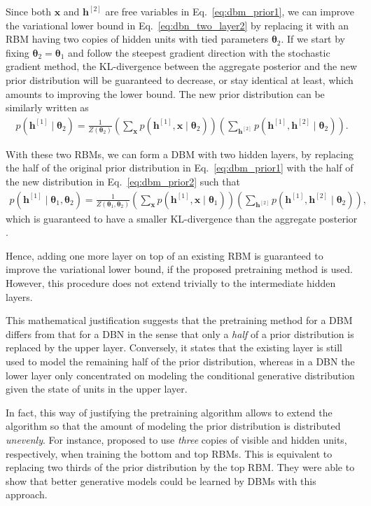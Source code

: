 \documentclass[dissertation,nocontribution,draft*]{aaltoseries}
\newcommand{\qlay}[1]{\left[#1\right]}
\newcommand{\vect}[1]{\mathbf{#1}}
\newcommand{\vects}[1]{\boldsymbol{#1}}
\newcommand{\vh}[0]{\vect{h}}
\newcommand{\vx}[0]{\vect{x}}
\newcommand{\TT}[0]{{\vects{\theta}}}
\begin{document}
Since both $\vx$ and $\vh^{\qlay{2}}$ are free variables in
Eq.~\eqref{eq:dbm_prior1}, we can improve the variational
lower bound in Eq.~\eqref{eq:dbn_two_layer2} by replacing it
with an RBM having two copies of hidden units with tied
parameters $\TT_2$. If we start by fixing $\TT_2=\TT_1$ and
follow the steepest gradient direction with the stochastic
gradient method, the KL-divergence between the aggregate
posterior and the new prior distribution will be guaranteed
to decrease, or stay identical at least, which amounts to
improving the lower bound. The new prior distribution can be
similarly written as
\begin{align}
    \label{eq:dbm_prior2}
    p(\vh^{\qlay{1}} \mid \TT_2) = \frac{1}{Z(\TT_2)} \left(
    \sum_{\vx} p(\vh^{\qlay{1}}, \vx \mid \TT_2) \right) \left(
    \sum_{\vh^{\qlay{2}}} p(\vh^{\qlay{1}}, \vh^{\qlay{2}} \mid \TT_2)
    \right).
\end{align}

With these two RBMs, we can form a DBM with two hidden
layers, by replacing the half of the original prior
distribution in Eq.~\eqref{eq:dbm_prior1} with the half of
the new distribution in Eq.~\eqref{eq:dbm_prior2} such that
\begin{align*}
    p(\vh^{\qlay{1}} \mid \TT_1, \TT_2) = \frac{1}{Z(\TT_1,
    \TT_2)} \left(
    \sum_{\vx} p(\vh^{\qlay{1}}, \vx \mid \TT_1) \right) \left(
    \sum_{\vh^{\qlay{2}}} p(\vh^{\qlay{1}}, \vh^{\qlay{2}} \mid \TT_2)
    \right),
\end{align*}
which is guaranteed to have a smaller KL-divergence than the
aggregate posterior \citep{Hinton2002}. 

Hence, adding one more layer on top of an existing RBM is
guaranteed to improve the variational lower bound, if the
proposed pretraining method is used. However, this procedure
does not extend trivially to the intermediate hidden layers.

This mathematical justification suggests that the
pretraining method for a DBM differs from that for a DBN in
the sense that only a \textit{half} of a prior distribution is
replaced by the upper layer. Conversely, it states that the
existing layer is still used to model the remaining half of
the prior distribution, whereas in a DBN the lower layer
only concentrated on modeling the conditional generative
distribution given the state of units in the upper layer. 

In fact, this way of justifying the pretraining algorithm
allows to extend the algorithm so that the amount of
modeling the prior distribution is distributed
\textit{unevenly}. For instance, \citet{Salakhutdinov2012}
proposed to use \textit{three} copies of visible and hidden
units, respectively, when training the bottom and top RBMs.
This is equivalent to replacing two thirds of the prior
distribution by the top RBM. They were able to show that
better generative models could be learned by DBMs with this
approach.
\end{document}
